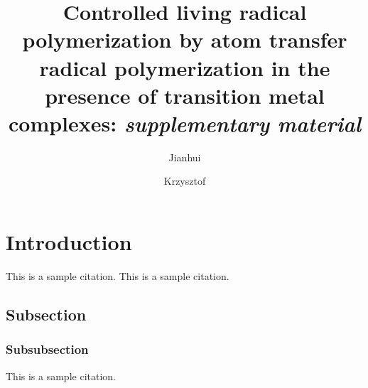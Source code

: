 \documentclass[10pt,aps,pre,raggedfooter,twocolumn,twoside,longbibliography,floatfix,superscriptaddress]{revtex4-1}
\begin{document}
\title{Controlled living radical polymerization by atom transfer radical polymerization in the presence of transition metal complexes:\textit{ supplementary material}}
\author{Jianhui }
\author{Krzysztof }\vspace*{3.5mm}

\maketitle

\setcounter{page}{1} %

\section{Introduction} \label{sec:intro}
\thispagestyle{frontmatter} %
\blindtext
This is a sample citation\cite{bitsanis1990}.
\blindtext
This is a sample citation\cite{baschnagel1999mrssp}.

\subsection{Subsection} \label{sec:tread}
\blindtext
\blindtext
\blindtext
\blindtext

\subsubsection{Subsubsection} \label{sec:content}
\blindtext
\blindtext
This is a sample citation\cite{rudnick1986jp}.
\blindtext

\end{document}
